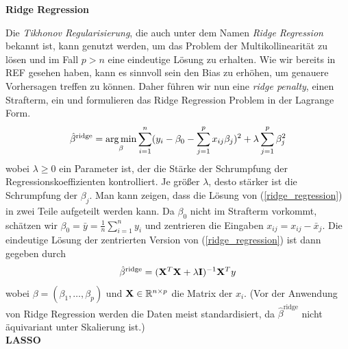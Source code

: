 \textbf{Ridge Regression}

Die \textit{Tikhonov Regularisierung}, die auch unter dem Namen \textit{Ridge Regression} bekannt ist, kann genutzt werden, um das Problem der Multikollinearität zu lösen und im Fall $p > n$ eine eindeutige Lösung zu erhalten.
Wie wir bereits in REF gesehen haben, kann es sinnvoll sein den Bias zu erhöhen, um genauere Vorhersagen treffen zu können. Daher führen wir nun eine \textit{ridge penalty}, einen Strafterm, ein und formulieren das Ridge Regression Problem in der Lagrange Form.
\begin{align}
\label{ridge_regression}
\hat{\beta}^{\text{ridge}} = \operatorname*{arg\,min}_{\beta} \sum_{i=1}^{n}(y_i - \beta_0 - \sum_{j=1}^p x_{ij}\beta_j)^2 + \lambda\sum_{j=1}^p \beta_j^2
\end{align}
wobei $\lambda \geq 0$ ein Parameter ist, der die Stärke der Schrumpfung der Regressionskoeffizienten kontrolliert. Je größer $\lambda$, desto stärker ist die Schrumpfung der $\beta_j$. Man kann zeigen, dass die Lösung von (\ref{ridge_regression}) in zwei Teile aufgeteilt werden kann. Da $\beta_0$ nicht im Strafterm vorkommt, schätzen wir $\beta_0 = \bar{y} = \frac{1}{n}\sum_{i=1}^{n} y_i$ und zentrieren die Eingaben $x_{ij} = x_{ij} - \bar{x}_j$. Die eindeutige Lösung der zentrierten Version von (\ref{ridge_regression}) ist dann gegeben durch
\begin{align}
\hat{\beta}^{\text{ridge}}  = (\mathbf{X}^T \mathbf{X} + \lambda\mathbf{I})^{-1}\mathbf{X}^Ty
\end{align}
wobei $\beta = (\beta_1, \ldots, \beta_p)$ und $\mathbf{X} \in \mathbb{R}^{n \times p}$ die Matrix der $x_i$. (Vor der Anwendung von Ridge Regression werden die Daten meist standardisiert, da $\hat{\beta}^{\text{ridge}}$ nicht äquivariant unter Skalierung ist.) \\


\textbf{LASSO}

